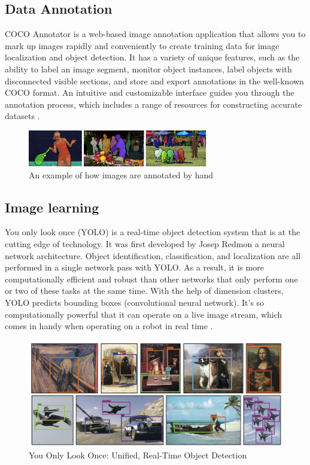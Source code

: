 \subsection{Data Annotation}
COCO Annotator is a web-based image annotation application that allows you to mark up images rapidly and conveniently to create training data for image localization and object detection. It has a variety of unique features, such as the ability to label an image segment, monitor object instances, label objects with disconnected visible sections, and store and export annotations in the well-known COCO format. An intuitive and customizable interface guides you through the annotation process, which includes a range of resources for constructing accurate datasets \cite{brooks_jsbrokscoco-annotator_2021}.
\begin{figure}[h]
    \centering
    \includegraphics[width=0.7\textwidth]{graphics/coco.png}
    \caption{An example of how images are annotated by hand}
    \label{fig:coco}
\end{figure}
\linespread{0}

\subsection{Image learning}
You only look once (YOLO) is a real-time object detection system that is at the cutting edge of technology. 
It was first developed by Josep Redmon a neural network architecture.
Object identification, classification, and localization are all performed in a single network pass with YOLO. 
As a result, it is more computationally efficient and robust than other networks that only perform one or two of these tasks at the same time. 
With the help of dimension clusters, YOLO predicts bounding boxes (convolutional neural network). 
It's so computationally powerful that it can operate on a live image stream, which comes in handy when operating on a robot in real time \cite{redmon_yolov3_2018}.
\begin{figure} [ht]
    \centering
    \includegraphics[width = 0.6 \textwidth]{graphics/yolo.PNG}
    \caption{You Only Look Once: Unified, Real-Time Object Detection \cite{redmon_you_2016}}
    \label{fig:yolo}
\end{figure}


